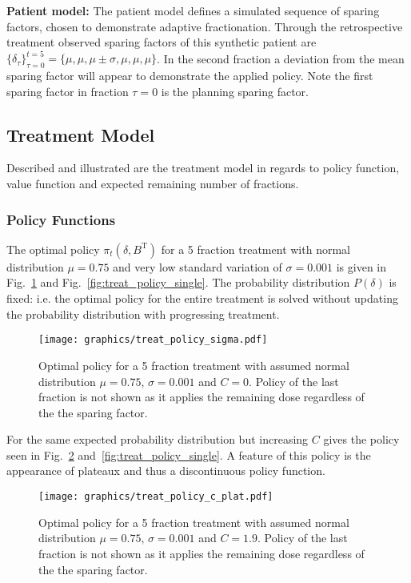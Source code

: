 \documentclass[\relativeRoot/ada.tex]{subfiles}
\begin{document}
\textbf{Patient model:} The patient model defines a simulated sequence of sparing factors, chosen to demonstrate adaptive fractionation. Through the retrospective treatment observed sparing factors of this synthetic patient are $\{\delta_\tau\}_{\tau=0}^{t=5} = \{\mu, \mu, \mu \pm \sigma, \mu,\mu, \mu \}$. In the second fraction a deviation from the mean sparing factor will appear to demonstrate the applied policy. Note the first sparing factor in fraction $\tau=0$ is the planning sparing factor.

\subsection{Treatment Model}

Described and illustrated are the treatment model in regards to policy function, value function and expected remaining number of fractions.

\subsubsection{Policy Functions}

The optimal policy $\pi_t(\delta, B^{\text{T}})$ for a 5 fraction treatment with normal distribution $\mu=0.75$ and very low standard variation of $\sigma=0.001$ is given in Fig.~\ref{fig:treat_policy_sigma} and Fig.~\ref{fig:treat_policy_single}. The probability distribution $P(\delta)$ is fixed: i.e. the optimal policy for the entire treatment is solved without updating the probability distribution with progressing treatment.

\begin{figure}[!htb]
    \centering
    \texttt{[image: graphics/treat\_policy\_sigma.pdf]}
    \caption{Optimal policy for a 5 fraction treatment with assumed normal distribution $\mu=0.75$, $\sigma=0.001$ and $C=0$. Policy of the last fraction is not shown as it applies the remaining dose regardless of the the sparing factor.}
    \label{fig:treat_policy_sigma}
\end{figure}

For the same expected probability distribution but increasing $C$ gives the policy seen in Fig.~\ref{fig:treat_policy_c_plat} and~\ref{fig:treat_policy_single}. A feature of this policy is the appearance of plateaux and thus a discontinuous policy function.

\begin{figure}[!htb]
    \centering
    \texttt{[image: graphics/treat\_policy\_c\_plat.pdf]}
    \caption{Optimal policy for a 5 fraction treatment with assumed normal distribution $\mu=0.75$, $\sigma=0.001$ and $C=1.9$. Policy of the last fraction is not shown as it applies the remaining dose regardless of the the sparing factor.}
    \label{fig:treat_policy_c_plat}
\end{figure}
\end{document}
